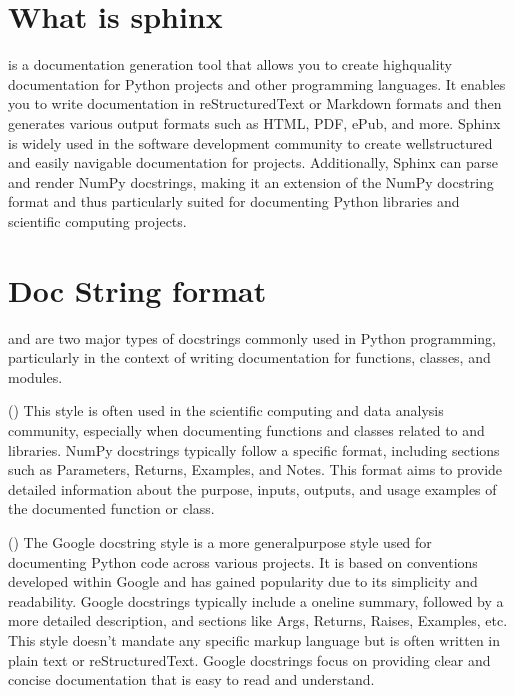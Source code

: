\documentclass[letterpaper,10pt,english]{sphinxmanual}
\begin{document}
\section{What is sphinx}
\label{\detokenize{Other/Sphinx_and_HTML_Web_Publishing:what-is-sphinx}}
\sphinxAtStartPar
{} is a documentation generation tool that allows you to create high\sphinxhyphen{}quality documentation for Python projects and other programming languages.
It enables you to write documentation in reStructuredText or Markdown formats and then generates various output formats such as HTML, PDF, ePub, and more. Sphinx is widely used in the software development community to create well\sphinxhyphen{}structured and easily navigable documentation for projects.
Additionally, Sphinx can parse and render NumPy docstrings, making it an extension of the NumPy docstring format and thus particularly suited for documenting Python libraries and scientific computing projects.


\section{Doc String format}
\label{\detokenize{Other/Sphinx_and_HTML_Web_Publishing:doc-string-format}}
\sphinxAtStartPar
{} and  are two major types of docstrings commonly used in Python programming, particularly in the context of writing documentation for functions, classes, and modules.

\sphinxAtStartPar
{} ()
This style is often used in the scientific computing and data analysis community, especially when documenting functions and classes related to  and  libraries.
NumPy docstrings typically follow a specific format, including sections such as Parameters, Returns, Examples, and Notes.
This format aims to provide detailed information about the purpose, inputs, outputs, and usage examples of the documented function or class.

\sphinxAtStartPar
{} ()
The Google docstring style is a more general\sphinxhyphen{}purpose style used for documenting Python code across various projects.
It is based on conventions developed within Google and has gained popularity due to its simplicity and readability.
Google docstrings typically include a one\sphinxhyphen{}line summary, followed by a more detailed description, and sections like Args, Returns, Raises, Examples, etc.
This style doesn’t mandate any specific markup language but is often written in plain text or reStructuredText.
Google docstrings focus on providing clear and concise documentation that is easy to read and understand.
\end{document}
